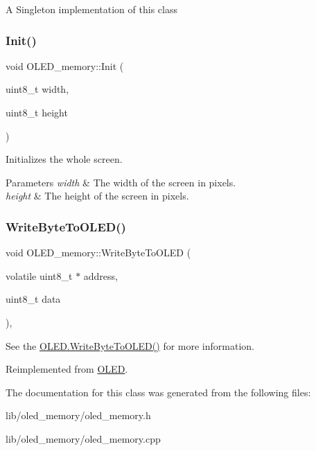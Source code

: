 A Singleton implementation of this class \hypertarget{class_o_l_e_d__memory_a5ad8acab1fda3221d490d49bd6aad418}{}\label{class_o_l_e_d__memory_a5ad8acab1fda3221d490d49bd6aad418} 
\subsubsection{\texorpdfstring{Init()}{Init()}}
{\footnotesize\ttfamily void O\+L\+E\+D\+\_\+memory\+::\+Init (\begin{DoxyParamCaption}\item[{uint8\+\_\+t}]{width,  }\item[{uint8\+\_\+t}]{height }\end{DoxyParamCaption})}

Initializes the whole screen. 
\begin{DoxyParams}{Parameters}
{\em width} & The width of the screen in pixels. \\
\hline
{\em height} & The height of the screen in pixels. \\
\hline
\end{DoxyParams}
\hypertarget{class_o_l_e_d__memory_a8859cddd8c5639d43ae89bb750984291}{}\label{class_o_l_e_d__memory_a8859cddd8c5639d43ae89bb750984291} 
\subsubsection{\texorpdfstring{Write\+Byte\+To\+O\+L\+E\+D()}{WriteByteToOLED()}}
{\footnotesize\ttfamily void O\+L\+E\+D\+\_\+memory\+::\+Write\+Byte\+To\+O\+L\+ED (\begin{DoxyParamCaption}\item[{volatile uint8\+\_\+t $\ast$}]{address,  }\item[{uint8\+\_\+t}]{data }\end{DoxyParamCaption})\hspace{0.3cm}{\ttfamily [protected]}, {\ttfamily [virtual]}}

See the \hyperlink{class_o_l_e_d_a044fdff65656804114d1d39d766099a2}{O\+L\+E\+D.\+Write\+Byte\+To\+O\+L\+E\+D()} for more information. 

Reimplemented from \hyperlink{class_o_l_e_d_a044fdff65656804114d1d39d766099a2}{O\+L\+ED}.



The documentation for this class was generated from the following files\+:\begin{DoxyCompactItemize}
\item 
lib/oled\+\_\+memory/oled\+\_\+memory.\+h\item 
lib/oled\+\_\+memory/oled\+\_\+memory.\+cpp\end{DoxyCompactItemize}
